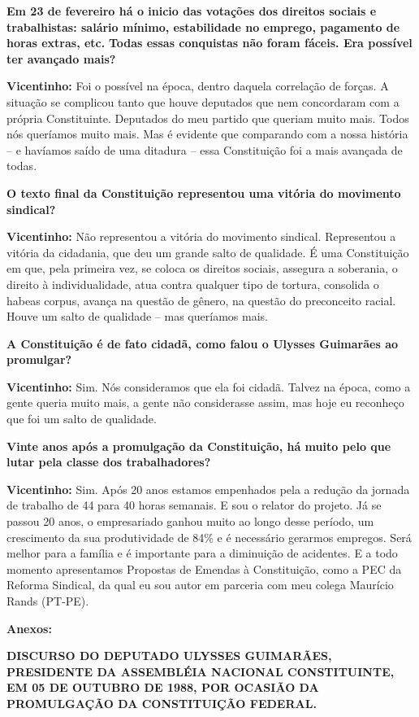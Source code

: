 \textbf{Em 23 de fevereiro há o inicio das votações dos direitos sociais
e trabalhistas: salário mínimo, estabilidade no emprego, pagamento de
horas extras, etc.} \textbf{Todas essas conquistas não foram fáceis. Era
possível ter avançado mais?}

\textbf{Vicentinho:} Foi o possível na época, dentro daquela correlação
de forças. A situação se complicou tanto que houve deputados que nem
concordaram com a própria Constituinte. Deputados do meu partido que
queriam muito mais. Todos nós queríamos muito mais. Mas é evidente que
comparando com a nossa história -- e havíamos saído de uma ditadura --
essa Constituição foi a mais avançada de todas.

\textbf{O texto final da Constituição representou uma vitória do
movimento sindical?}

\textbf{Vicentinho:} Não representou a vitória do movimento sindical.
Representou a vitória da cidadania, que deu um grande salto de
qualidade. É uma Constituição em que, pela primeira vez, se coloca os
direitos sociais, assegura a soberania, o direito à individualidade,
atua contra qualquer tipo de tortura, consolida o habeas corpus, avança
na questão de gênero, na questão do preconceito racial. Houve um salto
de qualidade -- mas queríamos mais.

\textbf{A Constituição é de fato cidadã, como falou o Ulysses Guimarães
ao promulgar?}

\textbf{Vicentinho:} Sim. Nós consideramos que ela foi cidadã. Talvez na
época, como a gente queria muito mais, a gente não considerasse assim,
mas hoje eu reconheço que foi um salto de qualidade.

\textbf{Vinte anos após a promulgação da Constituição, há muito pelo que
lutar pela classe dos trabalhadores?}

\textbf{Vicentinho:} Sim. Após 20 anos estamos empenhados pela a redução
da jornada de trabalho de 44 para 40 horas semanais. E sou o relator do
projeto. Já se passou 20 anos, o empresariado ganhou muito ao longo
desse período, um crescimento da sua produtividade de 84\% e é
necessário gerarmos empregos. Será melhor para a família e é importante
para a diminuição de acidentes. E a todo momento apresentamos Propostas
de Emendas à Constituição, como a PEC da Reforma Sindical, da qual eu
sou autor em parceria com meu colega Maurício Rands (PT-PE).

\textbf{Anexos:}

\textbf{DISCURSO DO DEPUTADO ULYSSES GUIMARÃES, PRESIDENTE DA ASSEMBLÉIA
NACIONAL CONSTITUINTE, EM 05 DE OUTUBRO DE 1988, POR OCASIÃO DA
PROMULGAÇÃO DA CONSTITUIÇÃO FEDERAL.}

